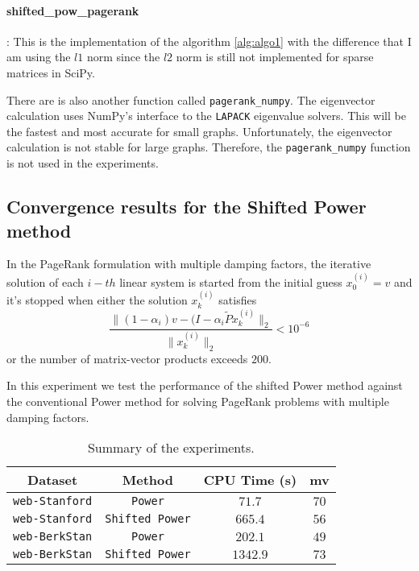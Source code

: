 \paragraph{shifted\_pow\_pagerank}: This is the implementation of the algorithm \ref{alg:algo1} with the difference that I am using the $l1$ norm since the $l2$ norm is still not implemented for sparse matrices in SciPy.

\vspace{0.5cm}

\noindent There are is also another function called \texttt{pagerank\_numpy}. The eigenvector calculation uses NumPy's interface to the \texttt{LAPACK} eigenvalue solvers. This will be the fastest and most accurate for small graphs. Unfortunately, the eigenvector calculation is not stable for large graphs. Therefore, the \texttt{pagerank\_numpy} function is not used in the experiments.

\subsection{Convergence results for the Shifted Power method}

In the PageRank formulation with multiple damping factors, the iterative solution of each $i-th$ linear system is started from the initial guess $x_0^{(i)} = v$ and it's stopped when either the solution $x_k^{(i)}$ satisfies
\begin{equation*}
    \frac{\lVert (1 - \alpha_i)v - (I - \alpha_i \tilde P x_k^{(i)} \rVert_2}{\lVert x_k^{(i)} \rVert_2} < 10^{-6}
\end{equation*}
or the number of matrix-vector products exceeds $200$. \vspace*{0.5cm}

\noindent In this experiment we test the performance of the shifted Power method against the conventional Power method for solving PageRank problems with multiple damping factors.

\begin{table}[h]
\centering
\begin{tabular}{|c|c|c|c|}
\hline
\textbf{Dataset} & \textbf{Method} & \textbf{CPU Time (s)} & \textbf{mv} \\ \hline
\texttt{web-Stanford} & \texttt{Power} & $71.7$ & $70$  \\ \hline
\texttt{web-Stanford} & \texttt{Shifted Power} & $665.4$ & $56$ \\ \hline

\hline

\texttt{web-BerkStan} & \texttt{Power} & $202.1$ & $49$  \\ \hline
\texttt{web-BerkStan} & \texttt{Shifted Power} & $1342.9$ & $73$ \\ \hline
\end{tabular}
\caption{Summary of the experiments.}
\label{tab:results}
\end{table}

